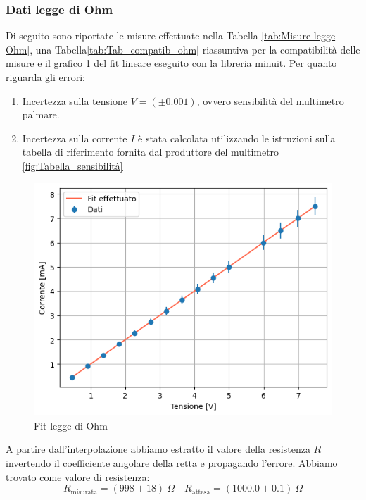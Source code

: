 \documentclass[letterpaper,12pt]{article}
\begin{document}
\subsubsection{Dati legge di Ohm}
Di seguito sono riportate le misure effettuate nella Tabella \ref{tab:Misure legge Ohm}, una Tabella\ref{tab:Tab_compatib_ohm} riassuntiva per la compatibilità delle misure e il grafico \ref{fig:Fit legge ohm} del fit lineare eseguito con la libreria minuit. Per quanto riguarda gli errori:
\begin{enumerate}
\item Incertezza sulla tensione $V=(\pm0.001)$, ovvero sensibilità del multimetro palmare.
\item Incertezza sulla corrente $I$ è stata calcolata utilizzando le istruzioni sulla tabella di riferimento fornita dal produttore del multimetro \ref{fig:Tabella_sensibilità}
\end{enumerate}
\newpage

\begin{figure}[htbp]
    \centering
    \includegraphics[width=.65\textwidth]{verifica_legge_di_ohm.png}
    \caption{Fit legge di Ohm}
    \label{fig:Fit legge ohm}
\end{figure}


\vspace{0.5cm}
A partire dall'interpolazione abbiamo estratto il valore della resistenza $R$ invertendo il coefficiente angolare della retta e propagando l'errore. Abbiamo trovato come valore di resistenza:
$$ R_{\text{misurata}} = (998\pm18)\ \Omega \quad R_{\text{attesa}} = (1000.0\pm0.1)\ \Omega$$
\end{document}
